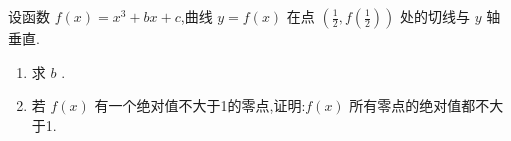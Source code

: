 \documentclass[class=ctexart,crop=false]{standalone}
\begin{document}
设函数 $f(x)=x^3+bx+c$,曲线 $y=f(x)$ 在点 $(\frac{1}{2},f(\frac{1}{2}))$
处的切线与 $y$ 轴垂直.
\begin{enumerate}[label=(\arabic*)]
    \item 求 $b$ .
    \item 若 $f(x)$ 有一个绝对值不大于1的零点,证明:$f(x)$  所有零点的绝对值都不大于1.
\end{enumerate}
\end{document}
